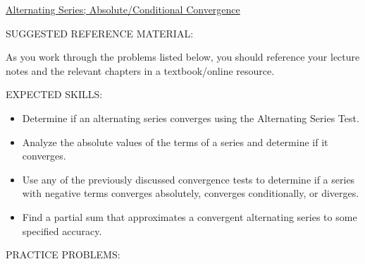 \documentclass[12pt]{article}
\begin{document}
\begin{center}
\underline{\LARGE{Alternating Series; Absolute/Conditional Convergence}}
\end{center}

\noindent SUGGESTED REFERENCE MATERIAL:

\medskip

\noindent As you work through the problems listed below, you should reference your lecture notes and the relevant chapters in a textbook/online resource.

\bigskip

\noindent EXPECTED SKILLS:

\medskip

\begin{itemize}[topsep=0pt]

\item Determine if an alternating series converges using the Alternating Series Test.

\item Analyze the absolute values of the terms of a series and determine if it converges.

\item Use any of the previously discussed convergence tests to determine if a series with negative terms converges absolutely, converges conditionally, or diverges.

\item Find a partial sum that approximates a convergent alternating series to some specified accuracy.

\end{itemize}

\medskip

\noindent PRACTICE PROBLEMS:

\medskip


\medskip
\end{document}
